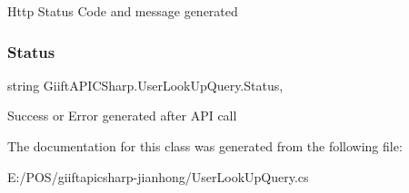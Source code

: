Http Status Code and message generated 

\mbox{\label{class_giift_a_p_i_c_sharp_1_1_user_look_up_query_a0e0858d7e1576692f53803749ee822fc}} 
\subsubsection{\texorpdfstring{Status}{Status}}
{\footnotesize\ttfamily string Giift\+A\+P\+I\+C\+Sharp.\+User\+Look\+Up\+Query.\+Status\hspace{0.3cm}{\ttfamily [get]}, {\ttfamily [set]}}



Success or Error generated after A\+PI call 



The documentation for this class was generated from the following file\+:\begin{DoxyCompactItemize}
\item 
E\+:/\+P\+O\+S/giiftapicsharp-\/jianhong/User\+Look\+Up\+Query.\+cs\end{DoxyCompactItemize}
